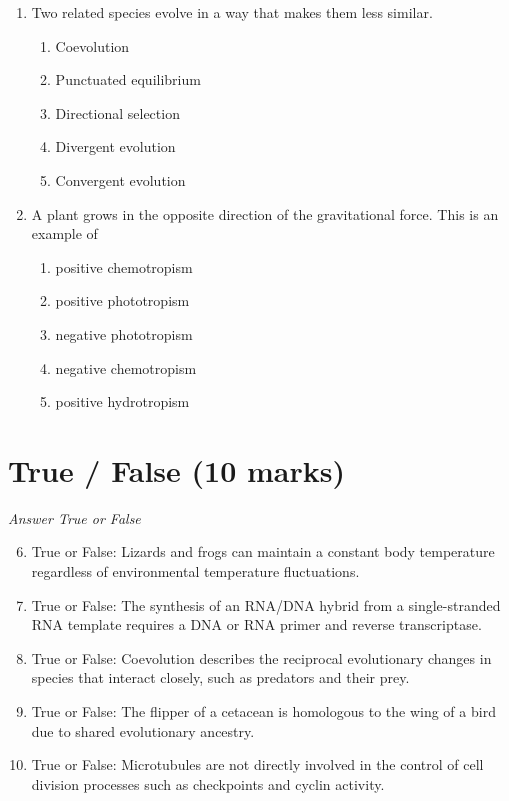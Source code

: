 \documentclass[12pt]{article}
\begin{document}
\begin{enumerate}[label=\arabic*.]
\begin{enumerate}[label=(\alph*)]
\end{enumerate}
\item Two related species evolve in a way that makes them less similar.
\begin{enumerate}[label=(\alph*)]
    \item Coevolution
    \item Punctuated equilibrium
    \item Directional selection
    \item Divergent evolution
    \item Convergent evolution
\end{enumerate}
\item A plant grows in the opposite direction of the gravitational force. This is an example of
\begin{enumerate}[label=(\alph*)]
    \item positive chemotropism
    \item positive phototropism
    \item negative phototropism
    \item negative chemotropism
    \item positive hydrotropism
\end{enumerate}
\end{enumerate}

\section*{True / False (10 marks)}
\textit{Answer True or False}
\begin{enumerate}[label=\arabic*.]
\setcounter{enumi}{5}
\item True or False: Lizards and frogs can maintain a constant body temperature regardless of environmental temperature fluctuations.
\item True or False: The synthesis of an RNA/DNA hybrid from a single-stranded RNA template requires a DNA or RNA primer and reverse transcriptase.
\item True or False: Coevolution describes the reciprocal evolutionary changes in species that interact closely, such as predators and their prey.
\item True or False: The flipper of a cetacean is homologous to the wing of a bird due to shared evolutionary ancestry.
\item True or False: Microtubules are not directly involved in the control of cell division processes such as checkpoints and cyclin activity.
\end{enumerate}
\end{document}
